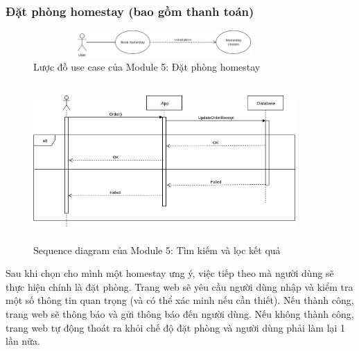 \subsubsection{Đặt phòng homestay (bao gồm thanh toán)}
\begin{figure}[!h]
	\centering
	\includegraphics[width = 10cm, height = 1cm]{parts/Khoa/khoa_ui/book.png}
	\caption{Lược đồ use case của Module 5: Đặt phòng homestay}
\end{figure}
\begin{figure}[!h]
	\centering
	\includegraphics[width = 10cm, height = 6cm]{parts/Khoa/khoa_ui/khoa_order.png}
	\caption{Sequence diagram của Module 5: Tìm kiếm và lọc kết quả}
\end{figure}
Sau khi chọn cho mình một homestay ưng ý, việc tiếp theo mà người dùng sẽ thực hiện chính là đặt phòng. Trang web sẽ yêu cầu người dùng nhập và kiểm tra một số thông tin quan trọng (và có thể xác minh nếu cần thiết). Nếu thành công, trang web sẽ thông báo và gửi thông báo đến người dùng. Nếu không thành công, trang web tự động thoát ra khỏi chế độ đặt phòng và người dùng phải làm lại 1 lần nữa.
